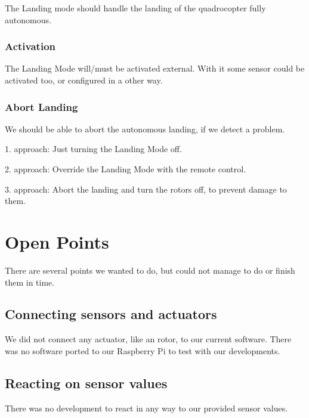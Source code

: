 The Landing mode should handle the landing of the quadrocopter fully autonomous.

\subsection{Activation}

The Landing Mode will/must be activated external. With it some sensor could be activated too, or configured in a other way. 


\subsection{Abort Landing}

We should be able to abort the autonomous landing, if we detect a problem.

1. approach: Just turning the Landing Mode off.

2. approach: Override the Landing Mode with the remote control.

3. approach: Abort the landing and turn the rotors off, to prevent damage to them.





\chapter{Open Points}
\label{sec:ergeb}

There are several points we wanted to do, but could not manage to do or finish them in time.

\section{Connecting sensors and actuators}

We did not connect any actuator, like an rotor, to our current software. There was no software ported to our Raspberry Pi to test with our developments.



\section{Reacting on sensor values}

There was no development to react in any way to our provided sensor values.





